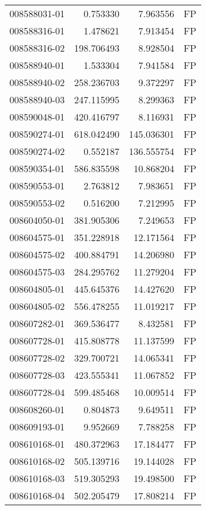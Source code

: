 \begin{tabular}{lrrl}
008588031-01 &    0.753330 &     7.963556 &   FP \\
008588316-01 &    1.478621 &     7.913454 &   FP \\
008588316-02 &  198.706493 &     8.928504 &   FP \\
008588940-01 &    1.533304 &     7.941584 &   FP \\
008588940-02 &  258.236703 &     9.372297 &   FP \\
008588940-03 &  247.115995 &     8.299363 &   FP \\
008590048-01 &  420.416797 &     8.116931 &   FP \\
008590274-01 &  618.042490 &   145.036301 &   FP \\
008590274-02 &    0.552187 &   136.555754 &   FP \\
008590354-01 &  586.835598 &    10.868204 &   FP \\
008590553-01 &    2.763812 &     7.983651 &   FP \\
008590553-02 &    0.516200 &     7.212995 &   FP \\
008604050-01 &  381.905306 &     7.249653 &   FP \\
008604575-01 &  351.228918 &    12.171564 &   FP \\
008604575-02 &  400.884791 &    14.206980 &   FP \\
008604575-03 &  284.295762 &    11.279204 &   FP \\
008604805-01 &  445.645376 &    14.427620 &   FP \\
008604805-02 &  556.478255 &    11.019217 &   FP \\
008607282-01 &  369.536477 &     8.432581 &   FP \\
008607728-01 &  415.808778 &    11.137599 &   FP \\
008607728-02 &  329.700721 &    14.065341 &   FP \\
008607728-03 &  423.555341 &    11.067852 &   FP \\
008607728-04 &  599.485468 &    10.009514 &   FP \\
008608260-01 &    0.804873 &     9.649511 &   FP \\
008609193-01 &    9.952669 &     7.788258 &   FP \\
008610168-01 &  480.372963 &    17.184477 &   FP \\
008610168-02 &  505.139716 &    19.144028 &   FP \\
008610168-03 &  519.305293 &    19.498500 &   FP \\
008610168-04 &  502.205479 &    17.808214 &   FP \\

\end{tabular}
